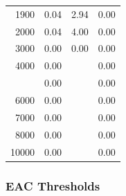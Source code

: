 \documentclass[12pt]{article}
\begin{document}
\begin{minipage}{0.5\textwidth}
\begin{tabular}{rccc}
   1900 & 0.04 & 2.94 & 0.00 \\ 
   2000 & 0.04 & 4.00 & 0.00 \\ 
   3000 & 0.00 & 0.00 & 0.00 \\ 
   4000 & 0.00 &  & 0.00 \\  \addlinespace
   5000 & 0.00 &  & 0.00 \\ 
   6000 & 0.00 &  & 0.00 \\ 
   7000 & 0.00 &  & 0.00 \\ 
   8000 & 0.00 &  & 0.00 \\ 
  10000 & 0.00 &  & 0.00 \\ 
\bottomrule
\end{tabular}

\end{minipage}




\subsubsection*{EAC Thresholds}
\end{document}
